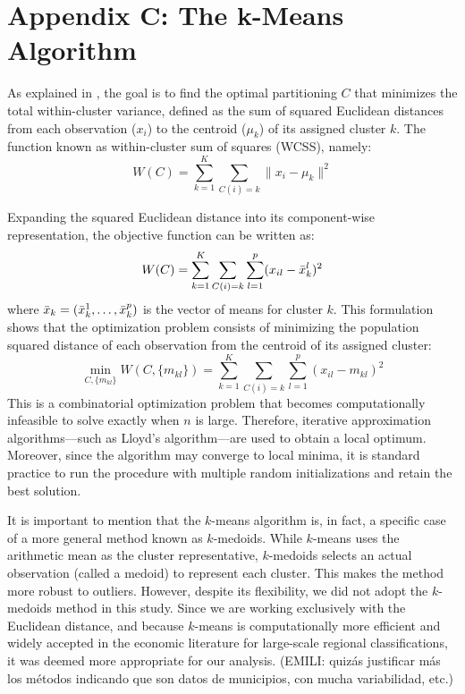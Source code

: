\documentclass[a4paper,11pt,oneside]{article}
\begin{document}


\pagebreak
\clearpage

\section{Appendix C: The k-Means Algorithm}
\label{sec:appendix_c}
As explained in \citep{james2013introduction}, the goal is to find the optimal partitioning $C$ that minimizes the total within-cluster variance, defined as the sum of squared Euclidean distances from each observation ($x_i$) to the centroid ($\mu_k$) of its assigned cluster $k$. The function known as within-cluster sum of squares (WCSS), namely:
\begin{equation}
 \label{eq:within_cluster_variance}
 W(C) = \sum_{k=1}^{K} \sum_{C(i)=k} \|x_i - \mu_k\|^2
\end{equation}

{\color{purple}

Expanding the squared Euclidean distance into its component-wise representation, the objective function can be written as:
\[
W(C) = \sum_{k=1}^{K} \sum_{C(i)=k} \sum_{l=1}^p (x_{il} - \Bar{x}_k^l)^2
\]
where \(\Bar{x}_k = (\Bar{x}_k^1, \dots, \Bar{x}_k^p)\) is the vector of means for cluster \(k\). This formulation shows that the optimization problem consists of minimizing the population squared distance of each observation from the centroid of its assigned cluster:
\[
\min_{C, \{m_{kl}\}} W(C, \{m_{kl}\}) = \sum_{k=1}^{K} \sum_{C(i)=k} \sum_{l=1}^p (x_{il} - m_{kl})^2
\]
This is a combinatorial optimization problem that becomes computationally infeasible to solve exactly when \(n\) is large. Therefore, iterative approximation algorithms—such as Lloyd’s algorithm—are used to obtain a local optimum. Moreover, since the algorithm may converge to local minima, it is standard practice to run the procedure with multiple random initializations and retain the best solution.
}


It is important to mention that the $k$-means algorithm is, in fact, a specific case of a more general method known as $k$-medoids. While $k$-means uses the arithmetic mean as the cluster representative, $k$-medoids selects an actual observation (called a medoid) to represent each cluster. This makes the method more robust to outliers. However, despite its flexibility, we did not adopt the $k$-medoids method in this study. Since we are working exclusively with the Euclidean distance, and because $k$-means is computationally more efficient and widely accepted in the economic literature for large-scale regional classifications, it was deemed more appropriate for our analysis.  {\color{red} (EMILI: quiz\'as justificar m\'as los m\'etodos indicando que son datos de municipios, con mucha variabilidad, etc.)}
\end{document}
